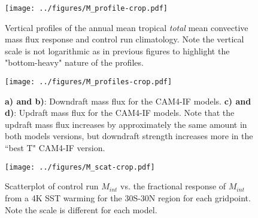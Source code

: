 \documentclass[letterpaper,12pt,titlepage,oneside,final]{book}
\begin{document}
\newpage
\begin{figure}[H]
\centering
\noindent\texttt{[image: ../figures/M\_profile-crop.pdf]}\hfill
\caption{Vertical profiles of the annual mean tropical \textit{total} mean convective mass flux response and control run climatology. Note the vertical scale is not logarithmic as in previous figures to highlight the "bottom-heavy" nature of the profiles.}
\end{figure}



\newpage
\begin{figure}[H]
\centering
\noindent\texttt{[image: ../figures/M\_profiles-crop.pdf]}\hfill
\caption{\textbf{a) and b)}: Downdraft mass flux for the CAM4-IF models. \textbf{c) and d)}: Updraft mass flux for the CAM4-IF models. Note that the updraft mass flux increases by approximately the same amount in both models versions, but downdraft strength increases more in the ``best T" CAM4-IF version.}
\end{figure}

\begin{figure}[H]
\centering
\noindent\texttt{[image: ../figures/M\_scat-crop.pdf]}\hfill
\caption{Scatterplot of control run $M_{int}$ vs. the fractional response of $M_{int}$ from a 4K SST warming for the 30S-30N region for each gridpoint. Note the scale is different for each model.}
\end{figure}
\end{document}
